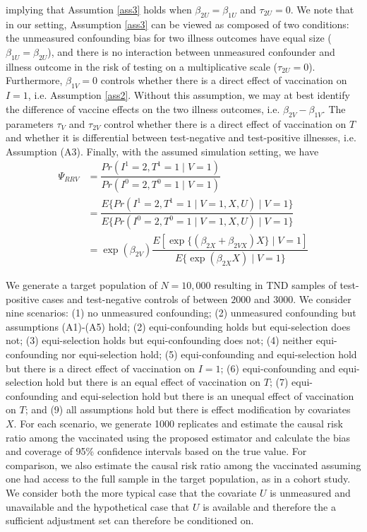 \documentclass[11pt]{article}
\begin{document}
implying that Assumtion \ref{ass3} holds when $\beta_{2U}=\beta_{1U}$ and $\tau_{2U}=0$. We note that in our setting, Assumption \ref{ass3} can be viewed as composed of two conditions: the unmeasured confounding bias for two illness outcomes have equal size ($\beta_{1U}=\beta_{2U}$), and there is no interaction between unmeasured confounder and illness outcome in the risk of testing on a multiplicative scale ($\tau_{2U}=0$). Furthermore, $\beta_{1V}=0$ controls whether there is a direct effect of vaccination on $I = 1$, i.e. Assumption \ref{ass2}. Without this assumption, we may at best identify the difference of vaccine effects on the two illness outcomes, i.e. $\beta_{2V}-\beta_{1V}$. The parameters $\tau_V$ and $\tau_{2V}$ control whether there is a direct effect of vaccination on $T$ and whether it is differential between test-negative and test-positive illnesses, i.e. Assumption (A3). Finally, with the assumed simulation setting, we have
\begin{align*}
    \Psi_{RRV} &= \dfrac{Pr(I^1=2, T^1=1\mid V=1)}{Pr(I^0=2, T^0=1\mid V=1)}\\
    &= \dfrac{E\{Pr(I^1=2, T^1=1\mid V=1, X, U)\mid V=1\}}{E\{Pr(I^0=2, T^0=1\mid V=1, X, U)\mid V=1\}}\\
    &= \exp(\beta_{2V})\dfrac{E[\exp\{(\beta_{2X}+\beta_{2VX})X\}\mid V=1]}{E\{\exp(\beta_{2X}X)\mid V=1\}}
\end{align*}



We generate a target population of $N = 10,000$ resulting in TND samples of test-positive cases and test-negative controls of between $2000$ and $3000$. We consider nine scenarios: (1) no unmeasured confounding; (2) unmeasured confounding but assumptions (A1)-(A5) hold; (2) equi-confounding holds but equi-selection does not; (3) equi-selection holds but equi-confounding does not; (4) neither equi-confounding nor equi-selection hold; (5) equi-confounding and equi-selection hold but there is a direct effect of vaccination on $I = 1$; (6) equi-confounding and equi-selection hold but there is an equal effect of vaccination on $T$; (7) equi-confounding and equi-selection hold but there is an unequal effect of vaccination on $T$; and (9) all assumptions hold but there is effect modification by covariates $X$. For each scenario, we generate 1000 replicates and estimate the causal risk ratio among the vaccinated using the proposed estimator and calculate the bias and coverage of 95\% confidence intervals based on the true value. For comparison, we also estimate the causal risk ratio among the vaccinated assuming one had access to the full sample in the target population, as in a cohort study. We consider both the more typical case that the covariate $U$ is unmeasured and unavailable and the hypothetical case that $U$ is available and therefore the a sufficient adjustment set can therefore be conditioned on. 
\end{document}
